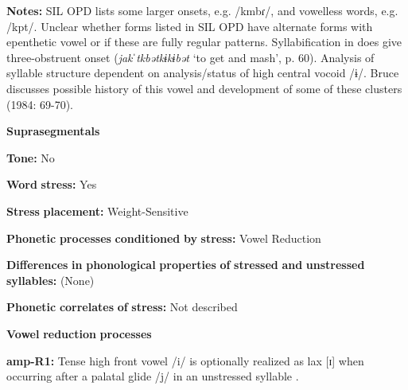 \begin{styleBody}
\textbf{Notes:} SIL OPD lists some larger onsets, e.g. /kmbɾ/, and vowelless words, e.g. /kpt/. Unclear whether forms listed in SIL OPD have alternate forms with epenthetic vowel or if these are fully regular patterns. Syllabification in \citet{Bruce1984} does give three-obstruent onset (\textit{jakˈtkbətkɨkɨbət} ‘to get and mash’, p. 60). Analysis of syllable structure dependent on analysis/status of high central vocoid /ɨ/. Bruce discusses possible history of this vowel and development of some of these clusters (1984: 69-70).
\end{styleBody}

\begin{styleBody}
\textbf{Suprasegmentals}
\end{styleBody}

\begin{styleBody}
\textbf{Tone:} No
\end{styleBody}

\begin{styleBody}
\textbf{Word} \textbf{stress:} Yes
\end{styleBody}

\begin{styleBody}
\textbf{Stress} \textbf{placement:} Weight-Sensitive
\end{styleBody}

\begin{styleBody}
\textbf{Phonetic} \textbf{processes} \textbf{conditioned} \textbf{by} \textbf{stress:} Vowel Reduction
\end{styleBody}

\begin{styleBody}
\textbf{Differences} \textbf{in} \textbf{phonological} \textbf{properties} \textbf{of} \textbf{stressed} \textbf{and} \textbf{unstressed} \textbf{syllables:} (None)
\end{styleBody}

\begin{styleBody}
\textbf{Phonetic} \textbf{correlates} \textbf{of} \textbf{stress:} Not described
\end{styleBody}

\begin{styleBody}
\textbf{Vowel} \textbf{reduction} \textbf{processes}
\end{styleBody}

\begin{styleBody}
\textbf{amp-R1:} Tense high front vowel /i/ is optionally realized as lax [ɪ] when occurring after a palatal glide /j/ in an unstressed syllable \citep[37]{Bruce1984}.
\end{styleBody}

